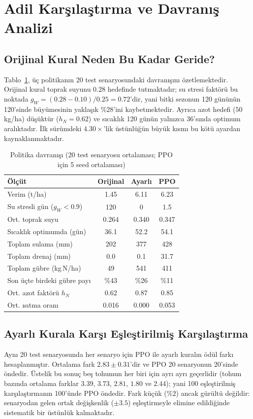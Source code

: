 \documentclass[conference,a4paper]{IEEEtran}
\begin{document}
\section{Adil Karşılaştırma ve Davranış Analizi}
\label{sec:adil}

\subsection{Orijinal Kural Neden Bu Kadar Geride?}
Tablo~\ref{tab:davranis}, üç politikanın 20 test senaryosundaki davranışını özetlemektedir. Orijinal kural toprak suyunu $0.28$ hedefinde tutmaktadır; su stresi faktörü bu noktada $g_W=(0.28-0.10)/0.25=0.72$'dir, yani bitki sezonun 120 gününün 120'sinde büyümesinin yaklaşık \%28'ini kaybetmektedir. Ayrıca azot hedefi ($50$\,kg/ha) düşüktür ($h_N=0.62$) ve sıcaklık 120 günün yalnızca 36'sında optimum aralıktadır. İlk sürümdeki $4.30\times$'lik üstünlüğün büyük kısmı bu kötü ayardan kaynaklanmaktadır.

\begin{table}[!t]
\caption{Politika davranışı (20 test senaryosu ortalaması; PPO için 5 seed ortalaması)}
\label{tab:davranis}
\centering
\footnotesize
\begin{tabular}{@{}lccc@{}}
\toprule
Ölçüt & Orijinal & Ayarlı & PPO\\
\midrule
Verim (t/ha) & 1.45 & 6.11 & 6.23\\
Su stresli gün ($g_W<0.9$) & 120 & 0 & 1.5\\
Ort. toprak suyu & 0.264 & 0.340 & 0.347\\
Sıcaklık optimumda (gün) & 36.1 & 52.2 & 54.1\\
Toplam sulama (mm) & 202 & 377 & 428\\
Toplam drenaj (mm) & 0.0 & 0.1 & 31.7\\
Toplam gübre (kg\,N/ha) & 49 & 541 & 411\\
Son üçte birdeki gübre payı & \%43 & \%26 & \%11\\
Ort. azot faktörü $h_N$ & 0.62 & 0.87 & 0.85\\
Ort. ısıtma oranı & 0.016 & 0.000 & 0.053\\
\bottomrule
\end{tabular}
\end{table}

\subsection{Ayarlı Kurala Karşı Eşleştirilmiş Karşılaştırma}
Aynı 20 test senaryosunda her senaryo için PPO ile ayarlı kuralın ödül farkı hesaplanmıştır. Ortalama fark $2.83\pm0.31$'dir ve PPO 20 senaryonun 20'sinde öndedir. Üstelik bu sonuç beş tohumun her biri için ayrı ayrı geçerlidir (tohum bazında ortalama farklar $3.39$, $3.73$, $2.81$, $1.80$ ve $2.44$); yani 100 eşleştirilmiş karşılaştırmanın 100'ünde PPO öndedir. Fark küçük ($\%2$) ancak gürültü değildir: senaryodan gelen ortak değişkenlik ($\pm3.5$) eşleştirmeyle elimine edildiğinde sistematik bir üstünlük kalmaktadır.
\end{document}
